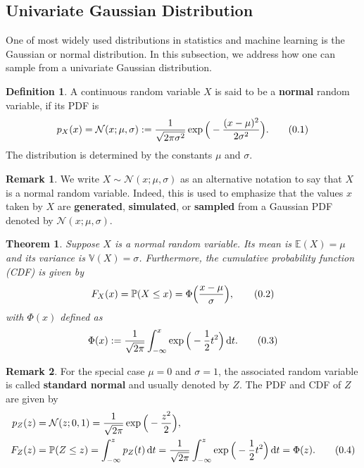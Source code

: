 \documentclass[10pt]{article}
\newtheorem{thm}{Theorem}[section]
\theoremstyle{definition}
\newtheorem{defn}{Definition}[section]
\newtheorem*{rem}{Remark}
\newcommand\eqnum{\addtocounter{equation}{1}\tag{\arabic{section}.\arabic{equation}}}
\DeclareMathOperator{\df}{d\!}
\begin{document}
\subsection{Univariate Gaussian Distribution}
One of most widely used distributions in statistics and machine learning is the Gaussian or normal distribution. In this subsection, we address how one can sample from a univariate Gaussian distribution.
\begin{defn}
A continuous random variable $X$ is said to be a \textbf{normal} random variable, if its PDF is
\begin{equation*}
p_{X}(x) = \mathcal{N}(x; \mu, \sigma) := \frac{1}{\sqrt{2\pi\sigma^2}}\exp\Big(-\frac{(x-\mu)^2}{2\sigma^2}\Big).
\eqnum
\end{equation*}
The distribution is determined by the constants $\mu$ and $\sigma$. 
\end{defn}
\begin{rem}
We write $X\sim \mathcal{N}(x; \mu, \sigma)$ as an alternative notation to say that $X$ is a normal random variable. Indeed, this is used to emphasize that the values $x$ taken by $X$ are \textbf{generated}, \textbf{simulated}, or \textbf{sampled} from a Gaussian PDF denoted by $\mathcal{N}(x; \mu, \sigma)$. 
\end{rem}
\begin{thm}
Suppose $X$ is a normal random variable. Its mean is $\mathbb{E}(X) = \mu$ and its variance is $\mathbb{V}(X)=\sigma$. Furthermore, the cumulative probability function (CDF) is given by
\begin{equation*}
F_{X}(x) = \mathbb{P}(X \leq x) = \Phi\Big(\frac{x-\mu}{\sigma}\Big),
\eqnum
\end{equation*}
with $\Phi(x)$ defined as
\begin{equation*}
\Phi(x) := \frac{1}{\sqrt{2\pi}}\int_{-\infty}^{x}\exp\Big(-\frac{1}{2}t^2\Big)\df t.
\eqnum
\end{equation*}
\end{thm}
\begin{rem}
For the special case $\mu = 0$ and $\sigma = 1$, the associated random variable is called \textbf{standard normal} and usually denoted by $Z$. The PDF and CDF of $Z$ are given by
\begin{align*}
p_{Z}(z) &= \mathcal{N}(z; 0, 1) = \frac{1}{\sqrt{2\pi}}\exp\Big(-\frac{z^2}{2}\Big), \\
F_Z(z) &= \mathbb{P}(Z\leq z) = \int_{-\infty}^{z}p_Z(t)\df t = 
\frac{1}{\sqrt{2\pi}}\int_{-\infty}^{z}\exp\Big(-\frac{1}{2}t^2\Big)\df t = \Phi(z).
\eqnum
\end{align*}
\end{rem}
\end{document}

